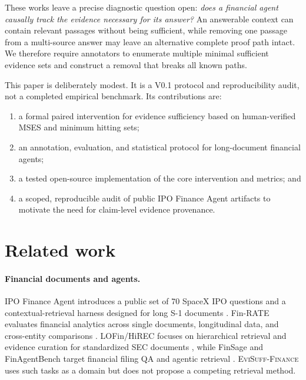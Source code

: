 \documentclass{article}
\newcommand{\benchmark}{\textsc{EviSuff-Finance}}
\newcommand{\mses}{\textsc{MSES}}
\begin{document}
These works leave a precise diagnostic question open: \emph{does a financial
agent causally track the evidence necessary for its answer?} An answerable
context can contain relevant passages without being sufficient, while removing
one passage from a multi-source answer may leave an alternative complete proof
path intact. We therefore require annotators to enumerate multiple minimal
sufficient evidence sets and construct a removal that breaks all known paths.

This paper is deliberately modest. It is a V0.1 protocol and reproducibility
audit, not a completed empirical benchmark. Its contributions are:

\begin{enumerate}[leftmargin=1.3em]
    \item a formal paired intervention for evidence sufficiency based on
    human-verified \mses{} and minimum hitting sets;
    \item an annotation, evaluation, and statistical protocol for long-document
    financial agents;
    \item a tested open-source implementation of the core intervention and
    metrics; and
    \item a scoped, reproducible audit of public IPO Finance Agent artifacts to
    motivate the need for claim-level evidence provenance.
\end{enumerate}

\section{Related work}

\paragraph{Financial documents and agents.}
IPO Finance Agent introduces a public set of 70 SpaceX IPO questions and a
contextual-retrieval harness designed for long S-1 documents
\citep{benhenda2026ipo}. Fin-RATE evaluates financial analytics across single
documents, longitudinal data, and cross-entity comparisons
\citep{jiang2026finrate}. LOFin/HiREC focuses on hierarchical retrieval and
evidence curation for standardized SEC documents \citep{choe2025hirec}, while
FinSage and FinAgentBench target financial filing QA and agentic retrieval
\citep{wang2025finsage,choi2025finagentbench}. \benchmark{} uses such tasks as
a domain but does not propose a competing retrieval method.
\end{document}
